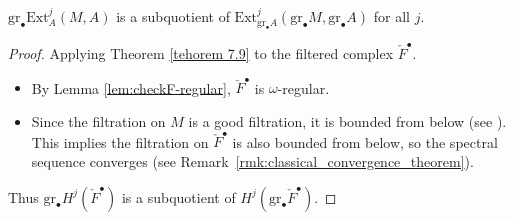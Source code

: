 \begin{corollary}\label{corollary 7.11}
    $\mathrm{gr}_{\bullet}\mathrm{Ext}_A^j (M, A)$ is a subquotient of $\mathrm{Ext}_{\mathrm{gr}_{\bullet} A}^j (\mathrm{gr} _{\bullet}M, \mathrm{gr}_{\bullet} A)$ for all $j$.
\end{corollary}
\begin{proof}
    Applying Theorem \ref{tehorem 7.9} to the filtered complex $\check{F}^{\bullet}$.
    \begin{itemize}
        \item By Lemma \ref{lem:checkF-regular}, $\check{F}^{\bullet}$ is $\omega$-regular.
        \item Since the filtration on $M$ is a good filtration, it is bounded from below (see \cite[Lemma~D.2.3]{hotta2008d}). This implies the filtration on $\check{F}^\bullet$ is also bounded from below, so the spectral sequence converges (see Remark~\ref{rmk:classical_convergence_theorem}).
    \end{itemize}
    Thus $\mathrm{gr}_{\bullet}H^j(\check{F}^{\bullet})$ is a subquotient of $H^j(\mathrm{gr}_{\bullet}\check{F}^{\bullet})$.

    \medskip


\end{proof}
